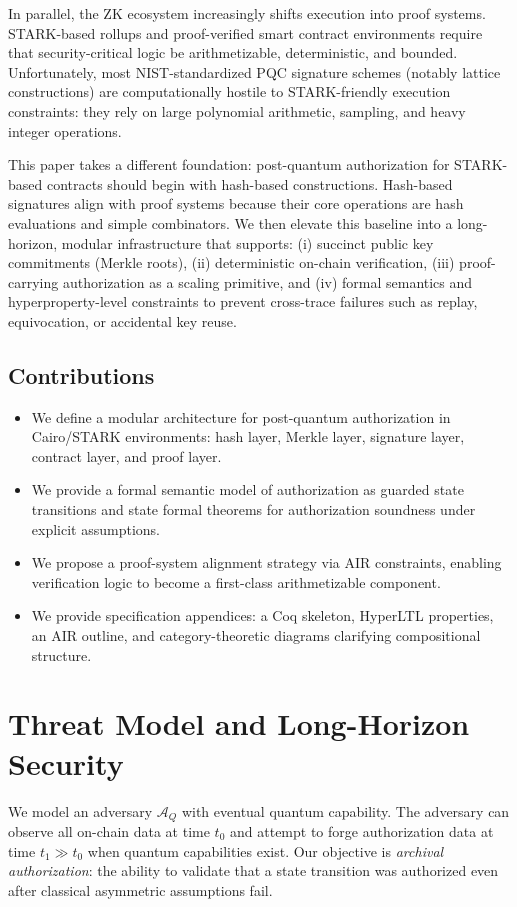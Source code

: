 \documentclass[conference]{IEEEtran}
\theoremstyle{definition}
\theoremstyle{plain}
\theoremstyle{remark}
\begin{document}
In parallel, the ZK ecosystem increasingly shifts execution into proof systems. STARK-based rollups and proof-verified smart contract environments require that security-critical logic be arithmetizable, deterministic, and bounded. Unfortunately, most NIST-standardized PQC signature schemes (notably lattice constructions) are computationally hostile to STARK-friendly execution constraints: they rely on large polynomial arithmetic, sampling, and heavy integer operations.

This paper takes a different foundation: post-quantum authorization for STARK-based contracts should begin with hash-based constructions. Hash-based signatures align with proof systems because their core operations are hash evaluations and simple combinators. We then elevate this baseline into a long-horizon, modular infrastructure that supports: (i) succinct public key commitments (Merkle roots), (ii) deterministic on-chain verification, (iii) proof-carrying authorization as a scaling primitive, and (iv) formal semantics and hyperproperty-level constraints to prevent cross-trace failures such as replay, equivocation, or accidental key reuse.

\subsection*{Contributions}
\begin{itemize}
\item We define a modular architecture for post-quantum authorization in Cairo/STARK environments: hash layer, Merkle layer, signature layer, contract layer, and proof layer.
\item We provide a formal semantic model of authorization as guarded state transitions and state formal theorems for authorization soundness under explicit assumptions.
\item We propose a proof-system alignment strategy via AIR constraints, enabling verification logic to become a first-class arithmetizable component.
\item We provide specification appendices: a Coq skeleton, HyperLTL properties, an AIR outline, and category-theoretic diagrams clarifying compositional structure.
\end{itemize}

\section{Threat Model and Long-Horizon Security}
We model an adversary $\mathcal{A}_Q$ with eventual quantum capability. The adversary can observe all on-chain data at time $t_0$ and attempt to forge authorization data at time $t_1 \gg t_0$ when quantum capabilities exist. Our objective is \emph{archival authorization}: the ability to validate that a state transition was authorized even after classical asymmetric assumptions fail.
\end{document}
